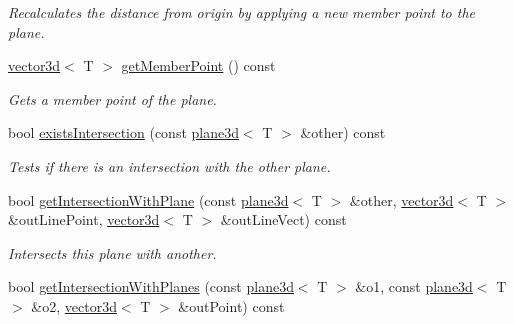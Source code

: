 \begin{DoxyCompactItemize}
\begin{DoxyCompactList}\small\item\em Recalculates the distance from origin by applying a new member point to the plane. \end{DoxyCompactList}\item 
\hyperlink{classirr_1_1core_1_1vector3d}{vector3d}$<$ T $>$ \hyperlink{classirr_1_1core_1_1plane3d_ae95084f1f1d942d2416aeaef247882fd}{get\+Member\+Point} () const \hypertarget{classirr_1_1core_1_1plane3d_ae95084f1f1d942d2416aeaef247882fd}{}\label{classirr_1_1core_1_1plane3d_ae95084f1f1d942d2416aeaef247882fd}

\begin{DoxyCompactList}\small\item\em Gets a member point of the plane. \end{DoxyCompactList}\item 
bool \hyperlink{classirr_1_1core_1_1plane3d_aa238ddaac4eb9d2781ccac678d594a78}{exists\+Intersection} (const \hyperlink{classirr_1_1core_1_1plane3d}{plane3d}$<$ T $>$ \&other) const 
\begin{DoxyCompactList}\small\item\em Tests if there is an intersection with the other plane. \end{DoxyCompactList}\item 
bool \hyperlink{classirr_1_1core_1_1plane3d_a8c611fd6346a361bbf34eb0e4fbd3fe0}{get\+Intersection\+With\+Plane} (const \hyperlink{classirr_1_1core_1_1plane3d}{plane3d}$<$ T $>$ \&other, \hyperlink{classirr_1_1core_1_1vector3d}{vector3d}$<$ T $>$ \&out\+Line\+Point, \hyperlink{classirr_1_1core_1_1vector3d}{vector3d}$<$ T $>$ \&out\+Line\+Vect) const 
\begin{DoxyCompactList}\small\item\em Intersects this plane with another. \end{DoxyCompactList}\item 
bool \hyperlink{classirr_1_1core_1_1plane3d_a42591d9bdd8dd03bb6b14836b6e5af7b}{get\+Intersection\+With\+Planes} (const \hyperlink{classirr_1_1core_1_1plane3d}{plane3d}$<$ T $>$ \&o1, const \hyperlink{classirr_1_1core_1_1plane3d}{plane3d}$<$ T $>$ \&o2, \hyperlink{classirr_1_1core_1_1vector3d}{vector3d}$<$ T $>$ \&out\+Point) const \hypertarget{classirr_1_1core_1_1plane3d_a42591d9bdd8dd03bb6b14836b6e5af7b}{}\label{classirr_1_1core_1_1plane3d_a42591d9bdd8dd03bb6b14836b6e5af7b}


\end{DoxyCompactItemize}
